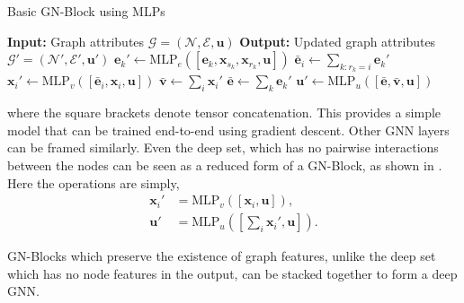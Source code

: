 \begin{algorithm}
    \caption{Basic GN-Block using MLPs}
    \label{alg:gn_block}
    \begin{algorithmic}[1]
        \State \textbf{Input:} Graph attributes $\mathcal{G} = (\mathcal{N}, \mathcal{E}, \mathbf{u})$
        \State \textbf{Output:} Updated graph attributes $\mathcal{G}' = (\mathcal{N}', \mathcal{E}', \mathbf{u}')$
            \State $\mathbf{e}_k' \gets \text{MLP}_e([\mathbf{e}_k, \mathbf{x}_{s_k}, \mathbf{x}_{r_k}, \mathbf{u}])$ 
        \EndFor
            \State $\mathbf{\bar{e}}_i \gets \sum_{k: r_k = i} \mathbf{e}_k'$ 
            \State $\mathbf{x}_i' \gets \text{MLP}_v([\mathbf{\bar{e}}_i, \mathbf{x}_i, \mathbf{u}])$ 
        \EndFor
        \State $\mathbf{\bar{v}} \gets \sum_{i} \mathbf{x}_i'$ 
        \State $\mathbf{\bar{e}} \gets \sum_{k} \mathbf{e}_k'$
        \State $\mathbf{u}' \gets \text{MLP}_u([\mathbf{\bar{e}}, \mathbf{\bar{v}}, \mathbf{u}])$ 
    \end{algorithmic}
\end{algorithm}

where the square brackets denote tensor concatenation.
This provides a simple model that can be trained end-to-end using gradient descent.
Other GNN layers can be framed similarly.
Even the deep set, which has no pairwise interactions between the nodes can be seen as a reduced form of a GN-Block, as shown in .
Here the operations are simply,
\begin{align}
    \mathbf{x}_i' &= \text{MLP}_v\left(\left[\mathbf{x}_i, \mathbf{u}\right]\right),\\
    \mathbf{u}' &= \text{MLP}_u\left(\left[\sum_{i} \mathbf{x}_i', \mathbf{u}\right]\right).
\end{align}

GN-Blocks which preserve the existence of graph features, unlike the deep set which has no node features in the output, can be stacked together to form a deep GNN.

